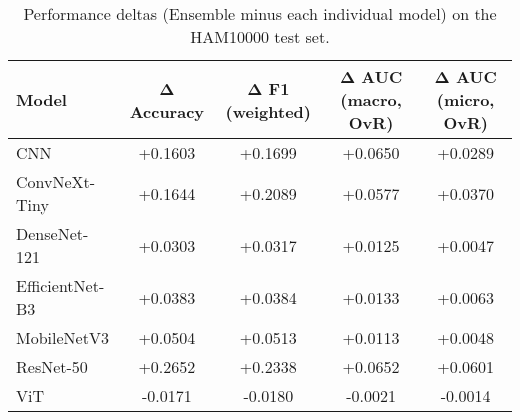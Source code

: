 \begin{table}
\caption{Performance deltas (Ensemble minus each individual model) on the HAM10000 test set.}
\label{tab:delta_ensemble_vs_models}
\begin{tabular}{lcccc}
\toprule
Model & Δ Accuracy & Δ F1 (weighted) & Δ AUC (macro, OvR) & Δ AUC (micro, OvR) \\
\midrule
CNN & +0.1603 & +0.1699 & +0.0650 & +0.0289 \\
ConvNeXt-Tiny & +0.1644 & +0.2089 & +0.0577 & +0.0370 \\
DenseNet-121 & +0.0303 & +0.0317 & +0.0125 & +0.0047 \\
EfficientNet-B3 & +0.0383 & +0.0384 & +0.0133 & +0.0063 \\
MobileNetV3 & +0.0504 & +0.0513 & +0.0113 & +0.0048 \\
ResNet-50 & +0.2652 & +0.2338 & +0.0652 & +0.0601 \\
ViT & -0.0171 & -0.0180 & -0.0021 & -0.0014 \\
\bottomrule
\end{tabular}
\end{table}
